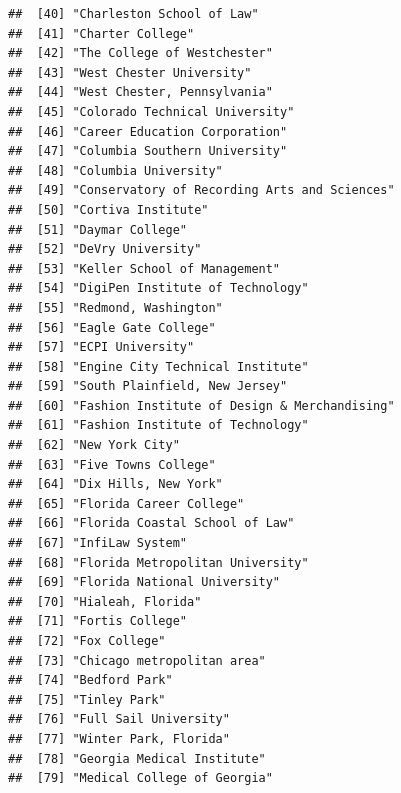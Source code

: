 \documentclass[
]{article}
\begin{document}
\begin{verbatim}
##  [40] "Charleston School of Law"                              
##  [41] "Charter College"                                       
##  [42] "The College of Westchester"                            
##  [43] "West Chester University"                               
##  [44] "West Chester, Pennsylvania"                            
##  [45] "Colorado Technical University"                         
##  [46] "Career Education Corporation"                          
##  [47] "Columbia Southern University"                          
##  [48] "Columbia University"                                   
##  [49] "Conservatory of Recording Arts and Sciences"           
##  [50] "Cortiva Institute"                                     
##  [51] "Daymar College"                                        
##  [52] "DeVry University"                                      
##  [53] "Keller School of Management"                           
##  [54] "DigiPen Institute of Technology"                       
##  [55] "Redmond, Washington"                                   
##  [56] "Eagle Gate College"                                    
##  [57] "ECPI University"                                       
##  [58] "Engine City Technical Institute"                       
##  [59] "South Plainfield, New Jersey"                          
##  [60] "Fashion Institute of Design & Merchandising"           
##  [61] "Fashion Institute of Technology"                       
##  [62] "New York City"                                         
##  [63] "Five Towns College"                                    
##  [64] "Dix Hills, New York"                                   
##  [65] "Florida Career College"                                
##  [66] "Florida Coastal School of Law"                         
##  [67] "InfiLaw System"                                        
##  [68] "Florida Metropolitan University"                       
##  [69] "Florida National University"                           
##  [70] "Hialeah, Florida"                                      
##  [71] "Fortis College"                                        
##  [72] "Fox College"                                           
##  [73] "Chicago metropolitan area"                             
##  [74] "Bedford Park"                                          
##  [75] "Tinley Park"                                           
##  [76] "Full Sail University"                                  
##  [77] "Winter Park, Florida"                                  
##  [78] "Georgia Medical Institute"                             
##  [79] "Medical College of Georgia"                            

\end{verbatim}
\end{document}
